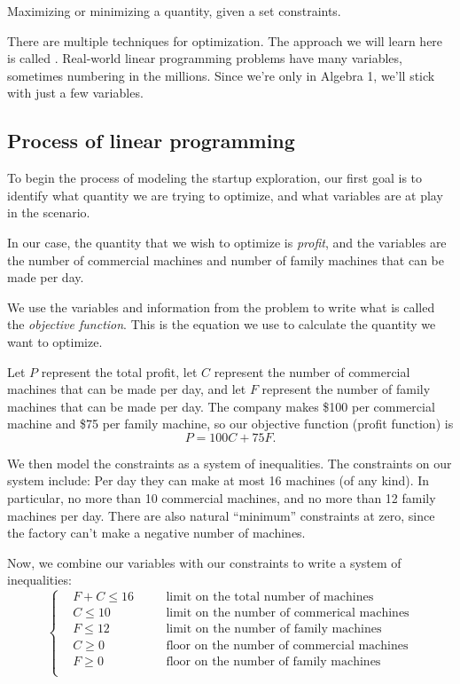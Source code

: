 \begin{boxeddef}[Optimization]
Maximizing or minimizing a quantity, given a set constraints.
\end{boxeddef}

There are multiple techniques for optimization. The approach we will learn here is called . Real-world linear programming problems have many variables, sometimes numbering in the millions. Since we're only in Algebra 1, we'll stick with just a few variables.

\subsection{Process of linear programming}

To begin the process of modeling the startup exploration, our first goal is to identify what quantity we are trying to optimize, and what variables are at play in the scenario.

In our case, the quantity that we wish to optimize is \textit{profit}, and the variables are the number of commercial machines and number of family machines that can be made per day.

We use the variables and information from the problem to write what is called the \textit{objective function}. This is the equation we use to calculate the quantity we want to optimize.

Let $P$ represent the total profit, let $C$ represent the number of commercial machines that can be made per day, and let $F$ represent the number of family machines that can be made per day. The company makes \$100 per commercial machine and \$75 per family machine, so our objective function (profit function) is\[P = 100C + 75F.\]

We then model the constraints as a system of inequalities. The constraints on our system include: Per day they can make at most 16 machines (of any kind). In particular, no more than 10 commercial machines, and no more than 12 family machines per day. There are also natural ``minimum'' constraints at zero, since the factory can't make a negative number of machines.

Now, we combine our variables with our constraints to write a system of inequalities:
\[\left\{ \begin{aligned}
&F + C \leq 16	&&\quad\text{limit on the total number of machines}\\
&C \leq 10		&&\quad\text{limit on the number of commerical machines}\\
&F \leq 12		&&\quad\text{limit on the number of family machines}\\
&C \geq 0		&&\quad\text{floor on the number of commercial machines}\\
&F \geq 0		&&\quad\text{floor on the number of family machines}\\
\end{aligned}\right.\]

